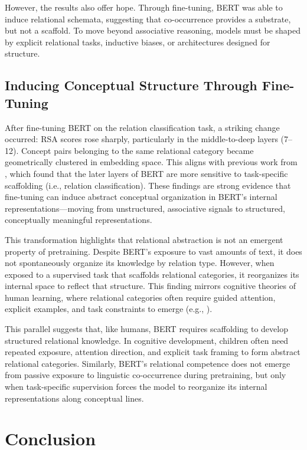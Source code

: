 \documentclass[stu,floatsintext]{apa7}
\begin{document}
However, the results also offer hope. Through fine-tuning, BERT was able to induce relational schemata, suggesting that co-occurrence provides a substrate, but not a scaffold. To move beyond associative reasoning, models must be shaped by explicit relational tasks, inductive biases, or architectures designed for structure.

\subsection{Inducing Conceptual Structure Through Fine-Tuning}

After fine-tuning BERT on the relation classification task, a striking change occurred: RSA scores rose sharply, particularly in the middle-to-deep layers (7–12).  Concept pairs belonging to the same relational category became geometrically clustered in embedding space. This aligns with previous work from \textcite{liu-etal-2019-linguistic}, which found that the later layers of BERT are more sensitive to task-specific scaffolding (i.e., relation classification). These findings are strong evidence that fine-tuning can induce abstract conceptual organization in BERT's internal representations—moving from unstructured, associative signals to structured, conceptually meaningful representations.

This transformation highlights that relational abstraction is not an emergent property of pretraining. Despite BERT's exposure to vast amounts of text, it does not spontaneously organize its knowledge by relation type. However, when exposed to a supervised task that scaffolds relational categories, it reorganizes its internal space to reflect that structure. This finding mirrors cognitive theories of human learning, where relational categories often require guided attention, explicit examples, and task constraints to emerge (e.g., \cite{Gentner1983}).

This parallel suggests that, like humans, BERT requires scaffolding to develop structured relational knowledge. In cognitive development, children often need repeated exposure, attention direction, and explicit task framing to form abstract relational categories. Similarly, BERT's relational competence does not emerge from passive exposure to linguistic co-occurrence during pretraining, but only when task-specific supervision forces the model to reorganize its internal representations along conceptual lines.

\section{Conclusion}
\end{document}
